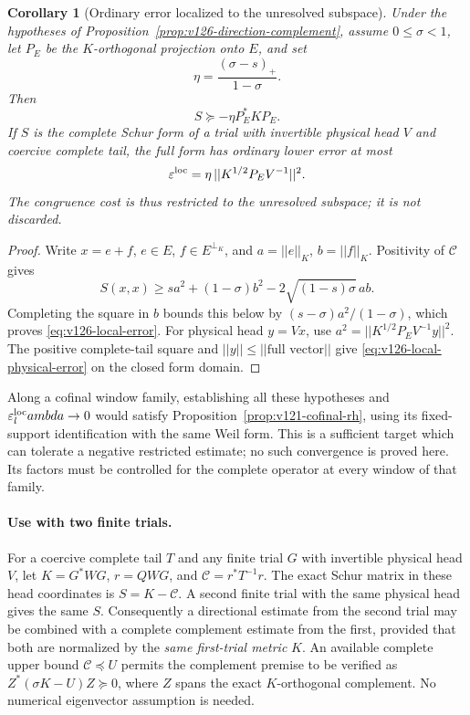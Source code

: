 \documentclass[11pt]{article}
\def\lambda{lambda}%
\def\norm#1{||#1||}%
\newtheorem{corollary}[theorem]{Corollary}
\theoremstyle{remark}
\newcommand{\norm}[1]{\left\lVert #1\right\rVert}
\begin{document}
\begin{corollary}[Ordinary error localized to the unresolved subspace]
\label{cor:v126-local-error}
Under the hypotheses of Proposition~\ref{prop:v126-direction-complement},
assume $0\le\sigma<1$, let $P_E$ be the $K$-orthogonal projection
onto $E$, and set
\[
 \eta=\frac{(\sigma-s)_+}{1-\sigma}.
\]
Then
\begin{equation}\label{eq:v126-local-error}
 S\succeq-\eta P_E^*KP_E.
\end{equation}
If $S$ is the complete Schur form of a trial with invertible
physical head $V$ and coercive complete tail, the full form has
ordinary lower error at most
\begin{equation}\label{eq:v126-local-physical-error}
 \varepsilon^{\rm loc}
 =\eta\,\norm{K^{1/2}P_EV^{-1}}^2.
\end{equation}
The congruence cost is thus restricted to the unresolved subspace;
it is not discarded.
\end{corollary}
\begin{proof}
Write $x=e+f$, $e\in E$, $f\in E^{\perp_K}$, and
$a=\norm e_K$, $b=\norm f_K$. Positivity of $\mathcal C$ gives
\[
 S(x,x)\ge sa^2+(1-\sigma)b^2
                 -2\sqrt{(1-s)\sigma}\,ab.
\]
Completing the square in $b$ bounds this below by
$(s-\sigma)a^2/(1-\sigma)$, which proves
\eqref{eq:v126-local-error}. For physical head $y=Vx$, use
$a^2=\norm{K^{1/2}P_EV^{-1}y}^2$. The positive complete-tail
square and $\norm y\le\norm{\text{full vector}}$ give
\eqref{eq:v126-local-physical-error} on the closed form domain.
\end{proof}

Along a cofinal window family, establishing all these hypotheses
and $\varepsilon^{\rm loc}_\lambda\to0$ would satisfy
Proposition~\ref{prop:v121-cofinal-rh}, using its fixed-support
identification with the same Weil form. This is a sufficient target
which can tolerate a negative restricted estimate; no such
convergence is proved here. Its factors must be controlled for
the complete operator at every window of that family.

\paragraph{Use with two finite trials.}
For a coercive complete tail $T$ and any finite trial $G$ with
invertible physical head $V$, let
$K=G^*WG$, $r=QWG$, and $\mathcal C=r^*T^{-1}r$.
The exact Schur matrix in these head coordinates is $S=K-\mathcal C$.
A second finite trial with the same physical head gives the same $S$.
Consequently a directional estimate from the second trial may be combined
with a complete complement estimate from the first, provided that both
are normalized by the \emph{same first-trial metric} $K$.
An available complete upper bound $\mathcal C\preceq U$ permits the
complement premise to be verified as
$Z^*(\sigma K-U)Z\succeq0$, where $Z$ spans the exact
$K$-orthogonal complement.  No numerical eigenvector assumption is needed.
\end{document}
